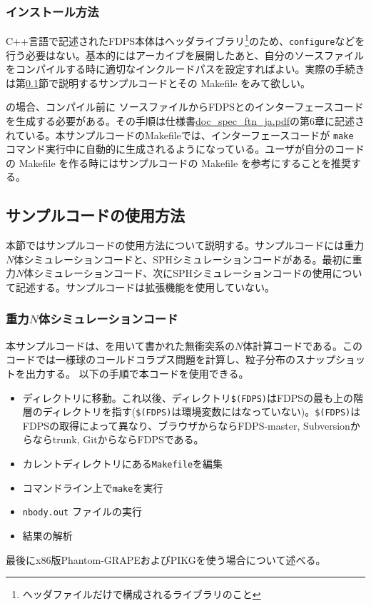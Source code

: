 \subsubsection{インストール方法}
\ifIF %
C++言語で記述されたFDPS本体はヘッダライブラリ\footnote{ヘッダファイルだけで構成されるライブラリのこと}のため、\texttt{configure}などを行う必要はない。基本的にはアーカイブを展開したあと、自分のソースファイルをコンパイルする時に適切なインクルードパスを設定すればよい。実際の手続きは第\ref{subsec:usage_of_sample_codes}節で説明するサンプルコードとその Makefile をみて欲しい。

\progLangName の場合、コンパイル前に \progLangName ソースファイルからFDPSとのインターフェースコードを生成する必要がある。その手順は仕様書\href{file://./doc_specs_ftn_ja.pdf}{doc\_spec\_ftn\_ja.pdf}の第6章に記述されている。本サンプルコードのMakefileでは、インターフェースコードが \texttt{make} コマンド実行中に自動的に生成されるようになっている。ユーザが自分のコードの Makefile を作る時にはサンプルコードの Makefile を参考にすることを推奨する。
\endifIF


\subsection{サンプルコードの使用方法}
\label{subsec:usage_of_sample_codes}
本節ではサンプルコードの使用方法について説明する。サンプルコードには重力$N$体シミュレーションコードと、SPHシミュレーションコードがある。最初に重力$N$体シミュレーションコード、次にSPHシミュレーションコードの使用について記述する。サンプルコードは拡張機能を使用していない。
\subsubsection{重力$N$体シミュレーションコード}
\label{subsubsec:usage_of_sample_codes:nbody}
本サンプルコードは、を用いて書かれた無衝突系の$N$体計算コードである。このコードでは一様球のコールドコラプス問題を計算し、粒子分布のスナップショットを出力する。
以下の手順で本コードを使用できる。
\begin{itemize}
\item ディレクトリ\dirNameNbodySample に移動。これ以後、ディレクトリ\texttt{\$(FDPS)}はFDPSの最も上の階層のディレクトリを指す(\texttt{\$(FDPS)}は環境変数にはなっていない)。\texttt{\$(FDPS)}はFDPSの取得によって異なり、ブラウザからならFDPS-master, Subversionからならtrunk, GitからならFDPSである。
\item カレントディレクトリにある\texttt{Makefile}を編集
\item コマンドライン上で\texttt{make}を実行
\item \texttt{nbody.out} ファイルの実行
\item 結果の解析
\end{itemize}
最後にx86版Phantom-GRAPEおよびPIKGを使う場合について述べる。

